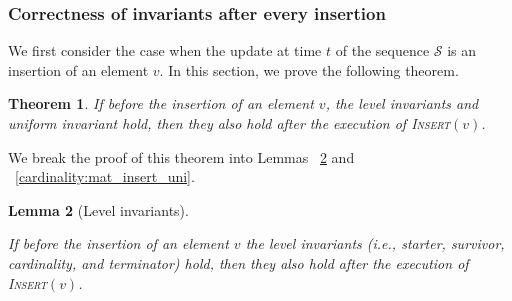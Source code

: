 \documentclass[11pt]{article}
\newtheorem{theorem}{Theorem}
\newtheorem{lemma}[theorem]{Lemma}
\newcommand{\insertv}{{\textsc{Insert}}}
\begin{document}
\subsubsection{Correctness of invariants after every insertion}

We first consider the case when the update at time $t$ of the sequence $\mathcal{S}$ is an insertion of an element $v$. 
In this section, we prove the following theorem. 


\begin{theorem}
\label{cardinality:mat_insert:invariants}
If before the insertion of an element $v$, the level invariants and uniform invariant hold, then they also hold after the execution of \insertv$(v)$. 
\end{theorem}

We break the proof of this theorem into Lemmas ~\ref{cardinality:mat_insert_level} and ~\ref{cardinality:mat_insert_uni}.


\begin{lemma} [Level invariants]
\label{cardinality:mat_insert_level}

If before the insertion of an element $v$ the level invariants (i.e., starter, survivor, cardinality, and terminator) hold, 
then they also hold after the execution of \insertv$(v)$. 
\end{lemma}
\end{document}
